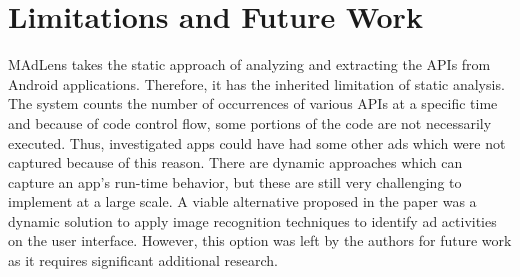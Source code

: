 \documentclass[conference]{IEEEtran}
\begin{document}
\section{Limitations and Future Work}
MAdLens takes the static approach of analyzing and extracting the APIs from Android applications. Therefore, it has the inherited limitation of static analysis. The system counts the number of occurrences of various APIs at a specific time and because of code control flow, some portions of the code are not necessarily executed. Thus, investigated apps could have had some other ads which were not captured because of this reason. There are dynamic approaches which can capture an app’s run-time behavior, but these are still very challenging to implement at a large scale. A viable alternative proposed in the paper was a dynamic solution to apply image recognition techniques to identify ad activities on the user interface. However, this option was left by the authors for future work as it requires significant additional research.







\end{document}
